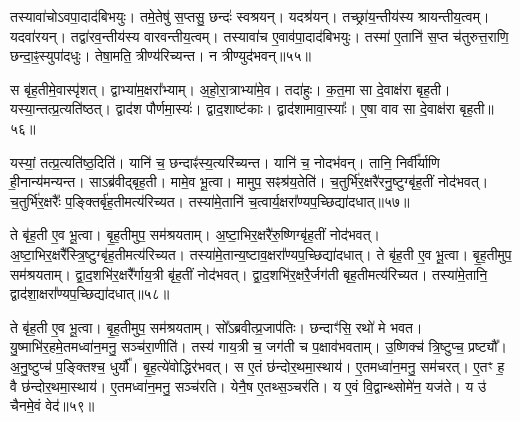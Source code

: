 तस्यावा॑चो\-ऽवपा॒दाद॑बिभयुः।
तमे॒तेषु॑ स॒प्तसु॒ छन्दः॑ स्वश्रयन्।
यदश्र॑यन्।
तच्छ्रा॑य॒न्तीय॑स्य श्रायन्तीय॒त्वम्।
यदवा॑रयन्।
तद्वा॑र\-व॒न्तीय॑स्य वारवन्तीय॒त्वम्।
तस्यावा॑च ए॒वाव॑पा॒दाद॑बिभयुः।
तस्मा॑ ए॒तानि॑ स॒प्त च॑तुरुत्त॒राणि॒ छन्दा॒ꣴ॒स्युपा॑दधुः।
तेषा॒मति॒ त्रीण्य॑रिच्यन्त।
न त्रीण्युद॑\-भवन्॥५५॥

स बृ॑ह॒तीमे॒वास्पृ॑शत्।
द्वाभ्या॑म॒क्षरा᳚भ्याम्।
अ॒हो॒रा॒त्राभ्या॑मे॒व।
तदा॑हुः।
क॒त॒मा सा दे॒वाक्ष॑रा बृह॒ती।
यस्या॒न्तत्प्र॒त्यति॑ष्ठत्।
द्वाद॑श पौर्णमा॒स्यः॑।
द्वाद॒शाष्ट॑काः।
द्वाद॑शामावा॒स्याः᳚।
ए॒षा वाव सा दे॒वाक्ष॑रा बृह॒ती॥५६॥

यस्यां॒ तत्प्र॒त्यति॑ष्ठ॒दिति॑।
यानि॑ च॒ छन्दाꣴ॑स्य॒त्यरि॑च्यन्त।
यानि॑ च॒ नोदभ॑वन्।
तानि॒ निर्वी᳚र्याणि ही॒नान्य॑मन्यन्त।
साऽब्र॑वीद्बृह॒ती।
मामे॒व भू॒त्वा।
मामुप॒ सꣴश्र॑य॒तेति॑।
च॒तुर्भि॑र॒क्षरै॑रनु॒\-ष्टुग्बृ॑ह॒तीं नोद॑भवत्।
च॒तुर्भि॑र॒क्षरैः᳚ प॒ङ्क्तिर्बृ॑ह॒ती\-मत्य॑रिच्यत।
तस्या॑मे॒तानि॑ च॒त्वार्य॒क्षरा᳚ण्यप॒च्छिद्या॑\-दधात्॥५७॥

ते बृ॑ह॒ती ए॒व भू॒त्वा।
बृ॒ह॒तीमुप॒ सम॑श्रयताम्।
अ॒ष्टा॒भि\-र॒क्षरै॑रु॒ष्णिग्बृ॑ह॒तीं नोद॑भवत्।
अ॒ष्टा॒भि\-र॒क्षरै᳚स्त्रि॒ष्टुग्बृ॑ह॒ती\-मत्य॑\-रिच्यत।
तस्या॑मे॒तान्य॒ष्टाव॒क्षरा᳚ण्यप॒च्छिद्या॑\-दधात्।
ते बृ॑ह॒ती ए॒व भू॒त्वा।
बृ॒ह॒तीमुप॒ सम॑श्रयताम्।
द्वा॒द॒शभि॑र॒क्षरै᳚र्गाय॒त्री बृ॑ह॒तीं नोद॑भवत्।
द्वा॒द॒शभि॑र॒क्षरै॒र्जग॑ती बृह॒तीमत्य॑रिच्यत।
तस्या॑मे॒तानि॒ द्वाद॑शा॒क्षरा᳚ण्यप॒च्छिद्या॑\-दधात्॥५८॥

ते बृ॑ह॒ती ए॒व भू॒त्वा।
बृ॒ह॒तीमुप॒ सम॑श्रयताम्।
सो᳚ऽब्रवीत्प्र॒जा\-प॑तिः।
छन्दाꣳ॑सि॒ रथो॑ मे भवत।
यु॒ष्माभि॑र॒हमे॒तमध्वा॑न॒मनु॒ सञ्च॑रा॒णीति॑।
तस्य॑ गाय॒त्री च॒ जग॑ती च प॒क्षाव॑भवताम्।
उ॒ष्णिक्च॑ त्रि॒ष्टुप्च॒ प्रष्ट्यौ᳚।
अ॒नु॒ष्टुप्च॑ प॒ङ्क्तिश्च॒ धुर्यौ᳚।
बृ॒ह॒त्ये॑वोद्धिर॑भवत्।
स ए॒तं छ॑न्दोर॒थमा॒स्थाय॑।
ए॒तमध्वा॑न॒मनु॒ सम॑चरत्।
ए॒तꣳ ह॒ वै छ॑न्दोर॒थमा॒स्थाय॑।
ए॒तमध्वा॑न॒मनु॒ सञ्च॑रति।
येनै॒ष ए॒तथ्स॒ञ्चर॑ति।
य ए॒वं वि॒द्वान्थ्सोमे॑न॒ यज॑ते।
य उ॑ चैनमे॒वं वेद॑॥५९॥\anuvakamend[अ॒भ॒व॒न्वाव सा दे॒वाक्ष॑रा बृह॒त्य॑दधा॒द्द्वाद॑शा॒क्षरा᳚ण्यप॒च्छिद्या॑दधादा॒स्थाय॒ षट्च॑]






\clearpage
{}
\setcounter{anuvakam}{0}

